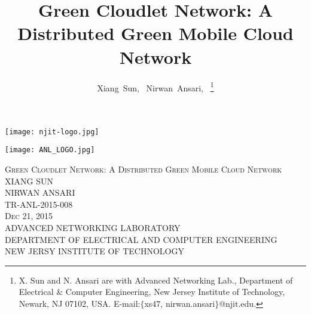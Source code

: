 \documentclass[journal,12pt,draftclsnofoot,onecolumn]{IEEEtran}
\begin{document}
\begin{titlepage}
\begin{center}
\vspace*{-2\baselineskip}
\begin{minipage}[l]{7cm}
\flushleft
\texttt{[image: njit-logo.jpg]}
\end{minipage}
\hfill
\begin{minipage}[r]{7cm}
\flushright
\texttt{[image: ANL\_LOGO.jpg]}
\end{minipage}

\vfill

\textsc{\LARGE Green Cloudlet Network: A Distributed Green Mobile Cloud Network\\[12pt]}
\vfill
\textsc{\LARGE  XIANG SUN \\ NIRWAN ANSARI}\\
\vfill
\textsc{\LARGE TR-ANL-2015-008\\[12pt]
\LARGE Dec 21, 2015}\\[1.5cm]
\vfill
{ADVANCED NETWORKING LABORATORY\\
 DEPARTMENT OF ELECTRICAL AND COMPUTER ENGINEERING\\
 NEW JERSY INSTITUTE OF TECHNOLOGY}
\end{center}
\end{titlepage}
\title{Green Cloudlet Network: A Distributed Green Mobile Cloud Network}

\author{Xiang~Sun,~
        Nirwan~Ansari,~ 
\thanks{X. Sun and N. Ansari are with Advanced Networking Lab., Department of Electrical $\&$ Computer Engineering, New Jersey Institute of Technology, Newark, NJ 07102, USA. E-mail:$\{$xs47, nirwan.ansari$\}$@njit.edu.}}




\maketitle
\end{document}
